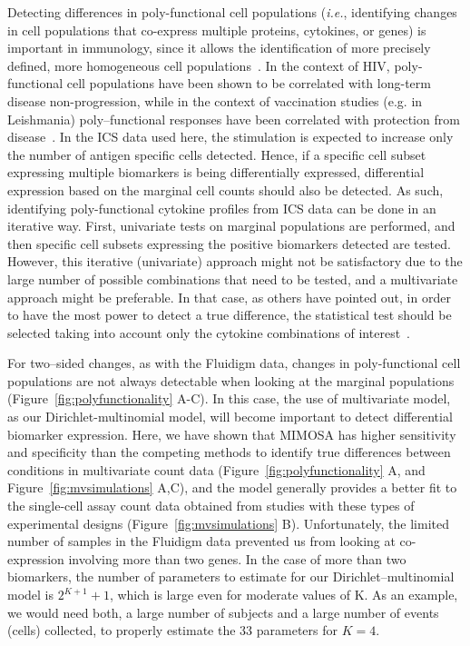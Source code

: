 \documentclass[12pt,oupdraft]{biostatistics}
\begin{document}
Detecting differences in poly-functional cell populations (\textit{i.e.}, identifying changes in cell populations that co-express multiple proteins, cytokines, or genes) is important in immunology, since it allows the identification of more precisely defined, more homogeneous cell populations~\citep{Milush:2009bz}.
In the context of HIV, poly-functional cell populations have been shown to be correlated with long-term disease non-progression, while in the context of vaccination studies (e.g. in Leishmania) poly--functional responses have been correlated with protection from disease~\citep{Betts:2006dw,Darrah:2007ih,Precopio:2007ht}.
In the ICS data used here, the stimulation is expected to increase only the number of antigen specific cells detected.
Hence, if a specific cell subset expressing multiple biomarkers is being differentially expressed, differential expression based on the marginal cell counts should also be detected.
As such, identifying poly-functional cytokine profiles from ICS data can be done in an iterative way.
First, univariate tests on marginal populations are performed, and then specific cell subsets expressing the positive biomarkers detected are tested.
However, this iterative (univariate) approach might not be satisfactory due to the large number of possible combinations that need to be tested, and a multivariate approach might be preferable.
In that case,  as others have pointed out, in order to have the most power to detect a true difference, the statistical test should be selected taking into account only the cytokine combinations of interest~\citep{Nason:2006dx}.

For two--sided changes, as with the Fluidigm data, changes in poly-functional cell populations are not always detectable when looking at the marginal populations (Figure~\ref{fig:polyfunctionality} A-C).
In this case, the use of multivariate model, as our Dirichlet-multinomial model, will become important to detect differential biomarker expression.
Here, we have shown that MIMOSA has higher sensitivity and specificity than the competing methods to identify true differences between conditions in multivariate count data (Figure~\ref{fig:polyfunctionality} A, and Figure~\ref{fig:mvsimulations} A,C), and the model generally provides a better fit to the single-cell assay count data obtained from studies with these types of experimental designs (Figure~\ref{fig:mvsimulations} B).
Unfortunately, the limited number of samples in the Fluidigm data prevented us from looking at co-expression involving more than two genes.
In the case of more than two biomarkers, the number of parameters to estimate for our Dirichlet--multinomial model is $2^{K+1}+1$, which is large even for moderate values of K. As an example, we would need both, a large number of subjects and a large number of events (cells) collected, to properly estimate the 33 parameters for $K=4$.
\end{document}
